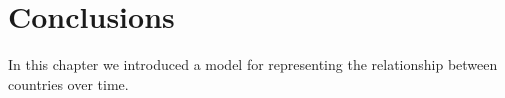 \section{Conclusions}

In this chapter we introduced a model for representing the
relationship between countries over time.